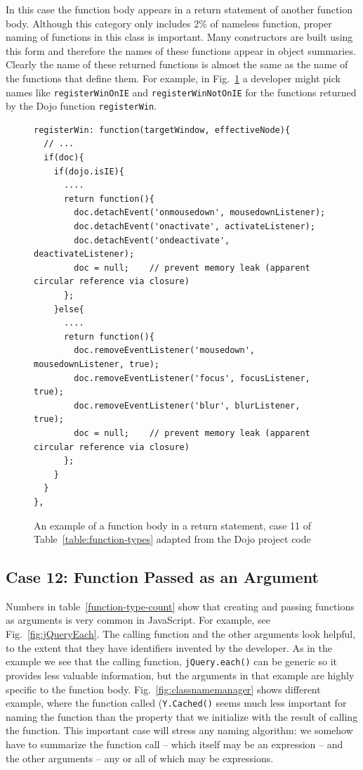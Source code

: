 \documentclass[10pt, preprint]{sigplanconf}
\begin{document}
In this case the function body appears in a return statement of another function body. Although this category only includes 2\% of nameless function, proper naming of functions in this class is important. Many constructors are built using this form and therefore the names of these functions appear in object summaries.    Clearly the name of these returned functions is almost the same as the name of the functions that define them. For example, in Fig.~\ref{fig:registerWin} a developer might pick names like \verb|registerWinOnIE| and \verb|registerWinNotOnIE| for the functions returned by the Dojo function \verb|registerWin|.
\begin{figure}[htbp]
\begin{verbatim}
registerWin: function(targetWindow, effectiveNode){
  // ...
  if(doc){
    if(dojo.isIE){
      ....
      return function(){
        doc.detachEvent('onmousedown', mousedownListener);
        doc.detachEvent('onactivate', activateListener);
        doc.detachEvent('ondeactivate', deactivateListener);
        doc = null;    // prevent memory leak (apparent circular reference via closure)
      };
    }else{
      ....
      return function(){
        doc.removeEventListener('mousedown', mousedownListener, true);
        doc.removeEventListener('focus', focusListener, true);
        doc.removeEventListener('blur', blurListener, true);
        doc = null;    // prevent memory leak (apparent circular reference via closure)
      };
    }
  }
},
\end{verbatim}
\label{fig:registerWin}
\caption{An example of a function body in a return statement, case 11 of Table~\ref{table:function-types}  adapted from the Dojo project code}
\end{figure}

\subsection{Case 12: Function Passed as an Argument}
Numbers in table~\ref{function-type-count} show that creating and passing functions as arguments is very common in JavaScript.
For example, see Fig.~\ref{fig:jQueryEach}. The calling function and the other arguments look helpful, to the extent that they have identifiers invented by the developer. As in the example we see that the calling function, \verb|jQuery.each()| can be generic so it provides less valuable information, but the arguments in that example are highly specific to the function body.  Fig.~\ref{fig:classnamemanager} shows different example, where the function called (\verb|Y.Cached()| seems much less important for naming the function than the property that we initialize with the result of calling the function.
This important case will stress any naming algorithm: we somehow have to summarize the function call -- which itself may be an expression -- and the other arguments -- any or all of which may be expressions. 
\end{document}
